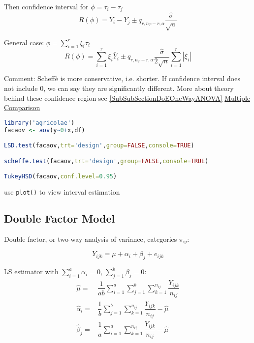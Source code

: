 \begin{itemize}[topsep=2pt,itemsep=0pt]
    Then confidence interval for $ \phi =\tau_i-\tau_j $ 
    \begin{equation}
        R(\phi )=\bar{Y}_i-\bar{Y}_j\pm q_{r,n_T-r,\alpha }\dfrac{\hat{\sigma }}{\sqrt{n}}
    \end{equation}
    
    General case: $ \phi =\sum_{i=1}^r\xi _i\tau_i $
    \begin{equation}
        R(\phi )=\sum_{i=1}^r\xi _i\bar{Y}_i\pm q_{r,n_T-r,\alpha }\dfrac{\hat{\sigma }}{2\sqrt{n}}\sum_{i=1}^r|\xi _i|
    \end{equation}
    
     
\end{itemize}

    Comment: Scheff\`{e} is more conservative, i.e. shorter. If confidence interval does not include $ 0 $, we can say they are significantly different. More about theory behind these confidence region see \autoref{SubSubSectionDoEOneWayANOVA}-\hyperlink{DoEMultipleComparison}{Multiple Comparison}

\begin{rcode}
\begin{lstlisting}[language=R]
library('agricolae')
facaov <- aov(y~0+x,df)

LSD.test(facaov,trt='design',group=FALSE,console=TRUE)

scheffe.test(facaov,trt='design',group=FALSE,console=TRUE)

TukeyHSD(facaov,conf.level=0.95)
\end{lstlisting}
use \lstinline|plot()| to view interval estimation
\end{rcode}    
    
    


\subsection{Double Factor Model}
    Double factor, or two-way analysis of variance, categories $ \pi_{ij} $:
    
    \begin{equation}
        Y_{ijk}= \mu +\alpha _i+\beta _j+e_{ijk}
    \end{equation}
    
    LS estimator with $ \sum_{i=1}^a \alpha _i=0 $, $ \sum_{j=1}^b\beta _j=0 $:
    \begin{align*}
        \hat{\mu }=&\dfrac{1}{ab}\sum_{i=1}^a\sum_{j=1}^b\sum_{k=1}^{n_{ij}}\dfrac{Y_{ijk}}{n_{ij}}\\
        \hat{\alpha }_i=&\dfrac{1}{b}\sum_{j=1}^b\sum_{k=1}^{n_{ij}}\dfrac{Y_{ijk}}{n_{ij}}-\hat{\mu }\\
        \hat{\beta }_j =&\dfrac{1}{a}\sum_{i=1}^a\sum_{k=1}^{n_{ij}}\dfrac{Y_{ijk}}{n_{ij}}-\hat{\mu }
    \end{align*}
    
